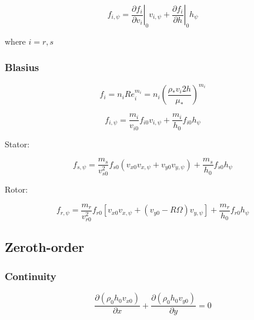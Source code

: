 \documentclass[12pt,letterpaper]{article}
\begin{document}
\begin{equation}
f_{i,\psi} = 
\left. \frac{\partial f_i}{\partial v_i} \right|_{0} v_{i,\psi} +
\left. \frac{\partial f_i}{\partial h} \right|_{0} h_{\psi}
\end{equation}

where $i=r,s$

\subsubsection{Blasius}

\begin{equation}
 f_i = n_i Re_i ^ {m_i} = n_i \left( \frac{\rho_* v_i 2 h }{\mu_*}\right) ^ {m_i}
\end{equation}

\begin{equation}
f_{i,\psi} = 
\frac{m_i}{v_{i0}} f_{i0} v_{i,\psi} +
\frac{m_i}{h_{0}} f_{i0} h_{\psi}
\end{equation}

Stator:

\begin{equation}
f_{s,\psi} = 
\frac{m_s}{v_{s0}^2} f_{s0} \left(
  v_{x0} v_{x,\psi}
+ v_{y0} v_{y,\psi}
\right)
 +
\frac{m_s}{h_{0}} f_{s0} h_{\psi}
\end{equation}

Rotor:

\begin{equation}
f_{r,\psi} = 
\frac{m_r}{v_{r0}^2} f_{r0} \left[
  v_{x0} v_{x,\psi}
+ \left( v_{y0} - R \Omega \right) v_{y,\psi}
\right]
 +
\frac{m_r}{h_{0}} f_{r0} h_{\psi}
\end{equation}


\subsection{Zeroth-order}

\subsubsection{Continuity}

\begin{dmath}
\frac{\partial \left( \rho_0 h_0 v_{x0} \right)}{\partial x} +
\frac{\partial \left( \rho_0 h_0 v_{y0} \right)}{\partial y}
 = 0
\end{dmath}
\end{document}
